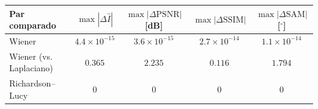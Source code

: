 \begin{tabular}{lcccc}
\toprule
Par comparado & $\max|\Delta \widehat I|$ & $\max|\Delta\mathrm{PSNR}|$ [dB] & $\max|\Delta\mathrm{SSIM}|$ & $\max|\Delta\mathrm{SAM}|$ [$^\circ$] \\
\midrule
Wiener & $4.4\times10^{-15}$ & $3.6\times10^{-15}$ & $2.7\times10^{-14}$ & $1.1\times10^{-14}$ \\
Wiener (vs. Laplaciano) & $0.365$ & $2.235$ & $0.116$ & $1.794$ \\
Richardson--Lucy & $0$ & $0$ & $0$ & $0$ \\
\bottomrule
\end{tabular}
